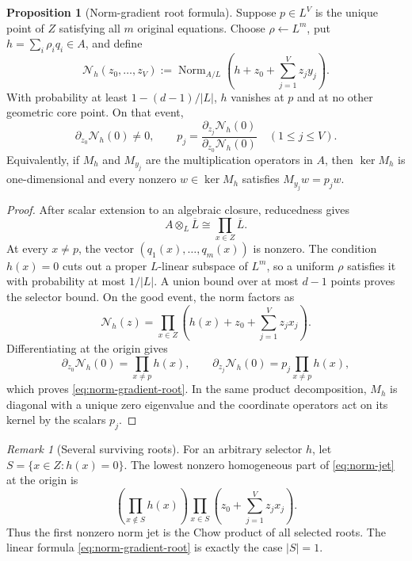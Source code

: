 \documentclass[11pt,a4paper]{article}
\theoremstyle{definition}
\newtheorem{proposition}[theorem]{Proposition}
\theoremstyle{remark}
\newtheorem{remark}[theorem]{Remark}
\begin{document}
\begin{proposition}[Norm-gradient root formula]\label{prop:implicit-root}
Suppose $p\in L^V$ is the unique point of $Z$ satisfying all $m$ original equations.  Choose $\rho\leftarrow L^m$, put $h=\sum_i\rho_iq_i\in A$, and define
\begin{equation}\label{eq:norm-jet}
\mathcal N_h(z_0,\ldots,z_V)
:=\operatorname{Norm}_{A/L}\!\left(h+z_0+\sum_{j=1}^Vz_jy_j\right).
\end{equation}
With probability at least $1-(d-1)/|L|$, $h$ vanishes at $p$ and at no other geometric core point.  On that event,
\begin{equation}\label{eq:norm-gradient-root}
\partial_{z_0}\mathcal N_h(0)\ne0,
\qquad
p_j=
\frac{\partial_{z_j}\mathcal N_h(0)}
     {\partial_{z_0}\mathcal N_h(0)}
\quad(1\le j\le V).
\end{equation}
Equivalently, if $M_h$ and $M_{y_j}$ are the multiplication operators in $A$, then $\ker M_h$ is one-dimensional and every nonzero $w\in\ker M_h$ satisfies $M_{y_j}w=p_jw$.
\end{proposition}

\begin{proof}
After scalar extension to an algebraic closure, reducedness gives
\[
A\otimes_L\overline L\cong\prod_{x\in Z}\overline L.
\]
At every $x\ne p$, the vector $(q_1(x),\ldots,q_m(x))$ is nonzero.  The condition $h(x)=0$ cuts out a proper $L$-linear subspace of $L^m$, so a uniform $\rho$ satisfies it with probability at most $1/|L|$.  A union bound over at most $d-1$ points proves the selector bound.  On the good event, the norm factors as
\[
\mathcal N_h(z)=
\prod_{x\in Z}\left(h(x)+z_0+\sum_{j=1}^Vz_jx_j\right).
\]
Differentiating at the origin gives
\[
\partial_{z_0}\mathcal N_h(0)=\prod_{x\ne p}h(x),
\qquad
\partial_{z_j}\mathcal N_h(0)=p_j\prod_{x\ne p}h(x),
\]
which proves \eqref{eq:norm-gradient-root}.  In the same product decomposition, $M_h$ is diagonal with a unique zero eigenvalue and the coordinate operators act on its kernel by the scalars $p_j$.
\end{proof}

\begin{remark}[Several surviving roots]\label{rem:norm-multiple}
For an arbitrary selector $h$, let $S=\{x\in Z:h(x)=0\}$.  The lowest nonzero homogeneous part of \eqref{eq:norm-jet} at the origin is
\[
\left(\prod_{x\notin S}h(x)\right)
\prod_{x\in S}\left(z_0+\sum_{j=1}^Vz_jx_j\right).
\]
Thus the first nonzero norm jet is the Chow product of all selected roots.  The linear formula \eqref{eq:norm-gradient-root} is exactly the case $|S|=1$.
\end{remark}
\end{document}
